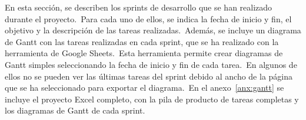
En esta sección, se describen los sprints de desarrollo que se han realizado durante el proyecto.\ Para cada uno de
ellos, se indica la fecha de inicio y fin, el objetivo y la descripción de las tareas realizadas.\ Además, se incluye
un diagrama de Gantt con las tareas realizadas en cada sprint, que se ha realizado con la herramienta
 de Google Sheets.\ Esta herramienta permite crear diagramas de Gantt simples
seleccionando la fecha de inicio y fin de cada tarea.\ En algunos de ellos no se pueden ver las últimas tareas del
sprint debido al ancho de la página que se ha seleccionado para exportar el diagrama.\ En el anexo~\ref{anx:gantt}
se incluye el proyecto Excel completo, con la pila de producto de tareas completas y los diagramas de Gantt de cada
sprint.













